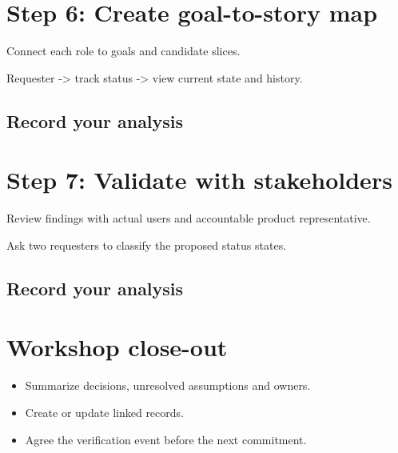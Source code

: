 \documentclass[11pt,letterpaper]{article}
\begin{document}
\section{Step 6: Create goal-to-story map}
Connect each role to goals and candidate slices.

\begin{tcolorbox}[colback=tealback,colframe=navy,title={Illustration},breakable]
Requester -> track status -> view current state and history.

\end{tcolorbox}
\subsection{Record your analysis}
\section{Step 7: Validate with stakeholders}
Review findings with actual users and accountable product representative.

\begin{tcolorbox}[colback=tealback,colframe=navy,title={Illustration},breakable]
Ask two requesters to classify the proposed status states.

\end{tcolorbox}
\subsection{Record your analysis}
\section{Workshop close-out}
\begin{itemize}[leftmargin=*,itemsep=2pt]
\item Summarize decisions, unresolved assumptions and owners.
\item Create or update linked records.
\item Agree the verification event before the next commitment.
\end{itemize}
\end{document}
